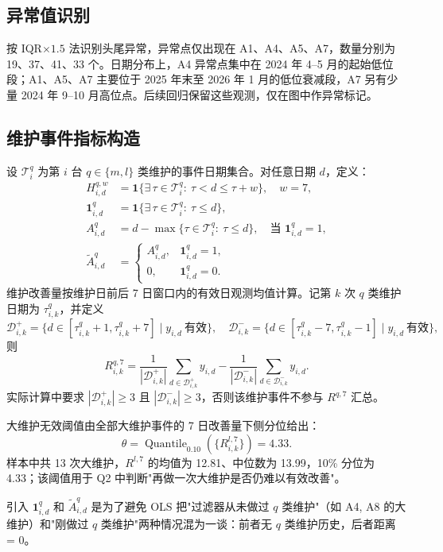 \documentclass[12pt, a4paper, fontset=fandol]{ctexart}
\theoremstyle{definition}
\begin{document}
\subsection{异常值识别}
按 IQR$\times 1.5$ 法识别头尾异常，异常点仅出现在 A1、A4、A5、A7，数量分别为 19、37、41、33 个。日期分布上，A4 异常点集中在 2024 年 4--5 月的起始低位段；A1、A5、A7 主要位于 2025 年末至 2026 年 1 月的低位衰减段，A7 另有少量 2024 年 9--10 月高位点。后续回归保留这些观测，仅在图中作异常标记。

\subsection{维护事件指标构造}
设 $\mathcal{T}_i^q$ 为第 $i$ 台 $q \in \{m, l\}$ 类维护的事件日期集合。对任意日期 $d$，定义：
\begin{align}
H_{i,d}^{q,w} &= \mathbf{1}\{\exists\,\tau \in \mathcal{T}_i^q:\ \tau < d \le \tau + w\}, \quad w = 7, \\
\mathbf{1}_{i,d}^q &= \mathbf{1}\{\exists\,\tau \in \mathcal{T}_i^q:\ \tau \le d\}, \\
A_{i,d}^q &= d - \max\{\tau \in \mathcal{T}_i^q:\ \tau \le d\}, \quad \text{当 } \mathbf{1}_{i,d}^q=1, \\
\tilde{A}_{i,d}^q &= \begin{cases}
A_{i,d}^q, & \mathbf{1}_{i,d}^q=1,\\
0, & \mathbf{1}_{i,d}^q=0.
\end{cases}
\end{align}
维护改善量按维护日前后 7 日窗口内的有效日观测均值计算。记第 $k$ 次 $q$ 类维护日期为 $\tau_{i,k}^q$，并定义
\[
\mathcal{D}_{i,k}^{+} = \{d \in [\tau_{i,k}^q+1,\tau_{i,k}^q+7] \mid y_{i,d}\ \text{有效}\},\quad
\mathcal{D}_{i,k}^{-} = \{d \in [\tau_{i,k}^q-7,\tau_{i,k}^q-1] \mid y_{i,d}\ \text{有效}\},
\]
则
\[
R_{i,k}^{q,7}
= \frac{1}{|\mathcal{D}_{i,k}^{+}|}\sum_{d\in\mathcal{D}_{i,k}^{+}} y_{i,d}
- \frac{1}{|\mathcal{D}_{i,k}^{-}|}\sum_{d\in\mathcal{D}_{i,k}^{-}} y_{i,d}.
\]
实际计算中要求 $|\mathcal{D}_{i,k}^{+}| \ge 3$ 且 $|\mathcal{D}_{i,k}^{-}| \ge 3$，否则该维护事件不参与 $R^{q,7}$ 汇总。

大维护无效阈值由全部大维护事件的 7 日改善量下侧分位给出：
\[
\theta = \operatorname{Quantile}_{0.10}\left(\{R_{i,k}^{l,7}\}\right) = 4.33.
\]
样本中共 13 次大维护，$R^{l,7}$ 的均值为 12.81、中位数为 13.99，10\% 分位为 4.33；该阈值用于 Q2 中判断"再做一次大维护是否仍难以有效改善"。

引入 $\mathbf{1}_{i,d}^q$ 和 $\tilde{A}_{i,d}^q$ 是为了避免 OLS 把"过滤器从未做过 $q$ 类维护"（如 A4, A8 的大维护）和"刚做过 $q$ 类维护"两种情况混为一谈：前者无 $q$ 类维护历史，后者距离 = 0。
\end{document}
